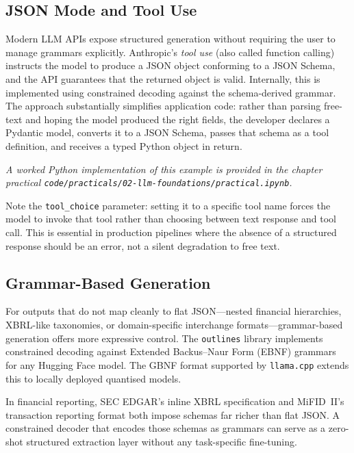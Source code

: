 \begin{context}
\subsection{JSON Mode and Tool Use}
\label{sec:structured-gen-json}

Modern LLM APIs expose structured generation without requiring the user to manage
grammars explicitly.  Anthropic's \emph{tool use} (also called function calling)
instructs the model to produce a JSON object conforming to a JSON Schema, and the
API guarantees that the returned object is valid.  Internally, this is implemented
using constrained decoding against the schema-derived grammar.  The approach
substantially simplifies application code: rather than parsing free-text and hoping
the model produced the right fields, the developer declares a Pydantic model, converts
it to a JSON Schema, passes that schema as a tool definition, and receives a typed
Python object in return.

\textit{A worked Python implementation of this example is provided in the chapter practical \texttt{code/practicals/02-llm-foundations/practical.ipynb}.}

Note the \texttt{tool\_choice} parameter: setting it to a specific tool name forces the
model to invoke that tool rather than choosing between text response and tool call.
This is essential in production pipelines where the absence of a structured response
should be an error, not a silent degradation to free text.

\subsection{Grammar-Based Generation}
\label{sec:structured-gen-grammar}

For outputs that do not map cleanly to flat JSON---nested financial hierarchies,
XBRL-like taxonomies, or domain-specific interchange formats---grammar-based generation
offers more expressive control.  The \texttt{outlines} library \citep{willard2023efficient}
implements constrained decoding against Extended Backus--Naur Form (EBNF) grammars
for any Hugging Face model.  The GBNF format supported by \texttt{llama.cpp} extends
this to locally deployed quantised models.

In financial reporting, SEC EDGAR's inline XBRL specification and MiFID~II's
transaction reporting format both impose schemas far richer than flat JSON.  A
constrained decoder that encodes those schemas as grammars can serve as a zero-shot
structured extraction layer without any task-specific fine-tuning.


\end{context}
